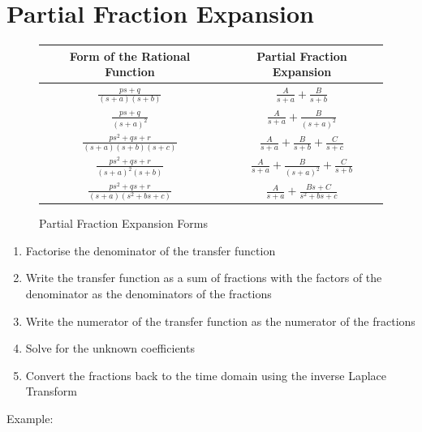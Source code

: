 \documentclass[oneside]{book}
\begin{document}
            \section{Partial Fraction Expansion}
                \begin{figure}[H]
                    \centering
                    \begin{tabular}{|c|c|}
                        \hline
                        \textbf{Form of the Rational Function} & \textbf{Partial Fraction Expansion}\\
                        \hline
                        $\frac{ps+q}{(s+a)(s+b)}$ & $\frac{A}{s+a} + \frac{B}{s+b}$\\
                        \hline
                        $\frac{ps+q}{(s+a)^2}$ & $\frac{A}{s+a} + \frac{B}{(s+a)^2}$\\
                        \hline
                        $\frac{ps^2+qs+r}{(s+a)(s+b)(s+c)}$ & $\frac{A}{s+a} + \frac{B}{s+b} + \frac{C}{s+c}$\\
                        \hline
                        $\frac{ps^2+qs+r}{(s+a)^2(s+b)}$ & $\frac{A}{s+a} + \frac{B}{(s+a)^2} + \frac{C}{s+b}$\\
                        \hline
                        $\frac{ps^2+qs+r}{(s+a)(s^2+bs+c)}$ & $\frac{A}{s+a} + \frac{Bs+C}{s^2+bs+c}$\\
                        \hline
                    \end{tabular}
                    \caption{Partial Fraction Expansion Forms}
                \end{figure}
                \begin{enumerate}
                    \item Factorise the denominator of the transfer function
                    \item Write the transfer function as a sum of fractions with the factors of the denominator as the denominators of the fractions
                    \item Write the numerator of the transfer function as the numerator of the fractions
                    \item Solve for the unknown coefficients
                    \item Convert the fractions back to the time domain using the inverse Laplace Transform
                \end{enumerate}
                Example:
\end{document}
